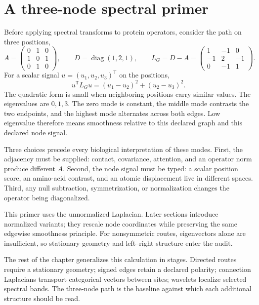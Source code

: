 \section{A three-node spectral primer}
\label{sec:book-spectral-primer}

Before applying spectral transforms to protein operators, consider the path on three positions,
\begin{equation}
A=
\begin{pmatrix}
0&1&0\\
1&0&1\\
0&1&0
\end{pmatrix},
\qquad
D=\operatorname{diag}(1,2,1),
\qquad
L_G=D-A=
\begin{pmatrix}
1&-1&0\\
-1&2&-1\\
0&-1&1
\end{pmatrix}.
\label{eq:book-three-node-laplacian}
\end{equation}
For a scalar signal $u=(u_1,u_2,u_3)^{\mathsf T}$ on the positions,
\begin{equation}
u^{\mathsf T}L_Gu=(u_1-u_2)^2+(u_2-u_3)^2.
\label{eq:book-three-node-dirichlet}
\end{equation}
The quadratic form is small when neighboring positions carry similar values.  The eigenvalues are
$0,1,3$.  The zero mode is constant, the middle mode contrasts the two endpoints, and the highest
mode alternates across both edges.  Low eigenvalue therefore means smoothness relative to this
declared graph and this declared node signal.

Three choices precede every biological interpretation of these modes.  First, the adjacency must
be supplied: contact, covariance, attention, and an operator norm produce different $A$.  Second,
the node signal must be typed: a scalar position score, an amino-acid contrast, and an atomic
displacement live in different spaces.  Third, any null subtraction, symmetrization, or
normalization changes the operator being diagonalized.

This primer uses the unnormalized Laplacian.  Later sections introduce normalized variants; they
rescale node coordinates while preserving the same edgewise smoothness principle.  For
nonsymmetric routes, eigenvectors alone are insufficient, so stationary geometry and left--right
structure enter the audit.

The rest of the chapter generalizes this calculation in stages.  Directed routes require a
stationary geometry; signed edges retain a declared polarity; connection Laplacians transport
categorical vectors between sites; wavelets localize selected spectral bands.  The three-node path
is the baseline against which each additional structure should be read.
